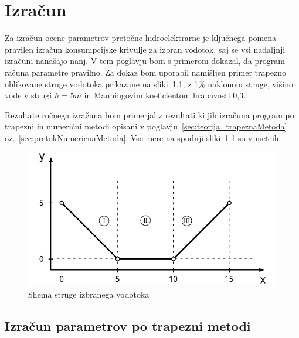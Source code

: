 \chapter{Izračun}\label{sec:izracun}

Za izračun ocene parametrov pretočne hidroelektrarne je ključnega pomena pravilen izračun konsumpcijske krivulje za izbran vodotok, saj se vsi nadaljnji izračuni nanašajo nanj. V tem poglavju bom s primerom dokazal, da program računa parametre pravilno. Za dokaz bom uporabil namišljen primer trapezno oblikovane struge vodotoka prikazane na sliki~\ref{fig:izracun_trapeznaStruga}, z 1\% naklonom struge, višino vode v strugi $h=5m$ in Manningovim koeficientom hrapavosti 0,3.

 Rezultate ročnega izračuna bom primerjal z rezultati ki jih izračuna program po trapezni in numerični metodi opisani v poglavju~\ref{sec:teorija_trapeznaMetoda}  oz.~\ref{sec:pretokNumericnaMetoda}. Vse mere na spodnji  sliki~\ref{fig:izracun_trapeznaStruga} so v metrih.



\begin{figure}[ht!]
	\begin{centering}
		\includegraphics{slike/izracuni/shema_trapezneStruge.pdf}		
		\caption{Shema struge izbranega vodotoka}\label{fig:izracun_trapeznaStruga}
	\end{centering}
\end{figure}




\section{Izračun parametrov po trapezni metodi}\label{sec:izracun_trapeznaMetoda}



